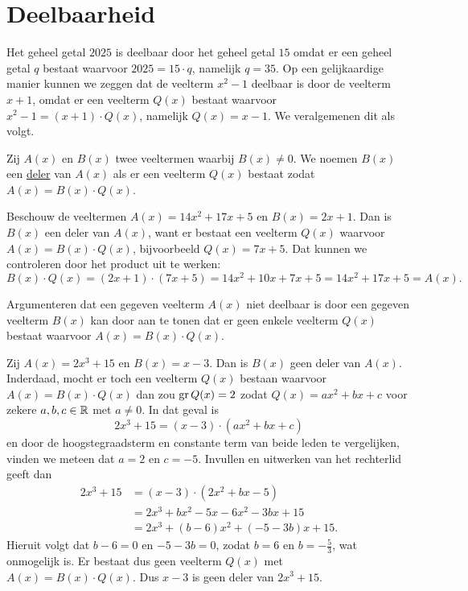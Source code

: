 \documentclass{ximera}
\begin{document}
\section{Deelbaarheid}

Het geheel getal $2025$ is deelbaar door het geheel getal $15$ omdat er een geheel getal $q$ bestaat waarvoor $2025 = 15\cdot q$, namelijk $q = 35$. Op een gelijkaardige manier kunnen we zeggen dat de veelterm $x^2-1$ deelbaar is door de veelterm $x+1$, omdat er een veelterm $Q(x)$ bestaat waarvoor $x^2-1 = (x+1)\cdot Q(x)$, namelijk $Q(x) = x-1$. We veralgemenen dit als volgt.

\begin{definitie}[in woorden]\label{definitie:deler}
Zij $A(x)$ en $B(x)$ twee veeltermen waarbij $B(x) \neq 0$. 
We noemen $B(x)$ een \underline{deler} van $A(x)$ als er een veelterm $Q(x)$ bestaat zodat $A(x) = B(x)\cdot Q(x)$.
\end{definitie}

\begin{voorbeeld}
Beschouw de veeltermen $A(x) = 14x^2+17x+5$ en $B(x) = 2x+1$. Dan is $B(x)$ een deler van $A(x)$, want er bestaat een veelterm $Q(x)$ waarvoor $A(x) = B(x) \cdot Q(x)$, bijvoorbeeld $Q(x) = 7x+5$. Dat kunnen we controleren door het product %
uit te werken:
\[
B(x) \cdot Q(x) = (2x+1) \cdot (7x+5) = 14x^2 + 10x + 7x + 5 = 14x^2 + 17x + 5 = A(x).
\]
\end{voorbeeld}

Argumenteren dat een gegeven veelterm $A(x)$ niet deelbaar is door een gegeven veelterm $B(x)$ kan door aan te tonen dat er geen enkele veelterm $Q(x)$ bestaat waarvoor $A(x) = B(x) \cdot Q(x)$. 

\begin{voorbeeld} \label{geendeler}
Zij $A(x) = 2x^3+15$ en $B(x) = x-3$. Dan is $B(x)$ geen deler van $A(x)$. Inderdaad, mocht er toch een veelterm $Q(x)$ bestaan waarvoor $A(x) = B(x) \cdot Q(x)$ dan zou $\operatorname{gr} Q(x) = 2$ zodat $Q(x) = a x^2 + b x + c$ voor zekere $a,b,c \in \mathbb{R}$ met $a \neq 0$. In dat geval is
\[
2x^3+15 = (x-3) \cdot (a x^2 + b x + c) 
\]
en door de hoogstegraadsterm en constante term van beide leden te vergelijken, vinden we meteen dat $a = 2$ en $c = -5$. Invullen en uitwerken van het rechterlid geeft dan
\begin{align*}
2x^3+15 
& = (x-3) \cdot (2 x^2 + b x - 5) \\
& = 2x^3 + bx^2 - 5x - 6x^2 - 3bx + 15 \\
& = 2x^3 + (b-6)x^2 + (-5-3b)x + 15.
\end{align*}
Hieruit volgt dat $b - 6 = 0$ en $-5-3b = 0$, zodat $b = 6$ en $b = -\frac{5}{3}$, wat onmogelijk is. Er bestaat dus geen veelterm $Q(x)$ met $A(x) = B(x) \cdot Q(x)$. Dus $x-3$ is geen deler van $2x^3+15$. 
\end{voorbeeld}
\end{document}

